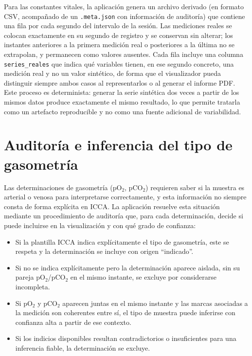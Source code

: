 \documentclass[
  spanish,
  a4paper,
  12pt,
  twoside]{memoir}
\providecommand{\tightlist}{%
  \setlength{\itemsep}{0pt}\setlength{\parskip}{0pt}}
\begin{document}
Para las constantes vitales, la aplicación genera un archivo derivado
(en formato CSV, acompañado de un \texttt{.meta.json} con información de
auditoría) que contiene una fila por cada segundo del intervalo de la
sesión. Las mediciones reales se colocan exactamente en su segundo de
registro y se conservan sin alterar; los instantes anteriores a la
primera medición real o posteriores a la última no se extrapolan, y
permanecen como valores ausentes. Cada fila incluye una columna
\texttt{series\_reales} que indica qué variables tienen, en ese segundo
concreto, una medición real y no un valor sintético, de forma que el
visualizador pueda distinguir siempre ambos casos al representarlos o al
generar el informe PDF. Este proceso es determinista: generar la serie
sintética dos veces a partir de los mismos datos produce exactamente el
mismo resultado, lo que permite tratarla como un artefacto reproducible
y no como una fuente adicional de variabilidad.

\section{Auditoría e inferencia del tipo de
gasometría}\label{auditoruxeda-e-inferencia-del-tipo-de-gasometruxeda}

Las determinaciones de gasometría (pO\(_2\), pCO\(_2\)) requieren saber
si la muestra es arterial o venosa para interpretarse correctamente, y
esta información no siempre consta de forma explícita en ICCA. La
aplicación resuelve esta situación mediante un procedimiento de
auditoría que, para cada determinación, decide si puede incluirse en la
visualización y con qué grado de confianza:

\begin{itemize}
\tightlist
\item
  Si la plantilla ICCA indica explícitamente el tipo de gasometría, este
  se respeta y la determinación se incluye con origen ``indicado''.
\item
  Si no se indica explícitamente pero la determinación aparece aislada,
  sin su pareja pO\(_2\)/pCO\(_2\) en el mismo instante, se excluye por
  considerarse incompleta.
\item
  Si pO\(_2\) y pCO\(_2\) aparecen juntas en el mismo instante y las
  marcas asociadas a la medición son coherentes entre sí, el tipo de
  muestra puede inferirse con confianza alta a partir de ese contexto.
\item
  Si los indicios disponibles resultan contradictorios o insuficientes
  para una inferencia fiable, la determinación se excluye.
\end{itemize}
\end{document}
